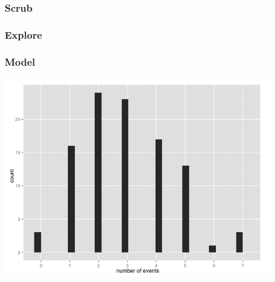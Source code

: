 \documentclass[xcolor=dvipsnames, 9pt]{beamer}
\begin{document}
\begin{frame}
    \frametitle{Scrub}
\end{frame}

{
\begin{frame}
    \frametitle{Explore}
\end{frame}
}

\begin{frame}
    \frametitle{Model}
    \begin{center}
    \includegraphics[width=0.9\textwidth]{histogram.png}
    \end{center}
\end{frame}
\end{document}
